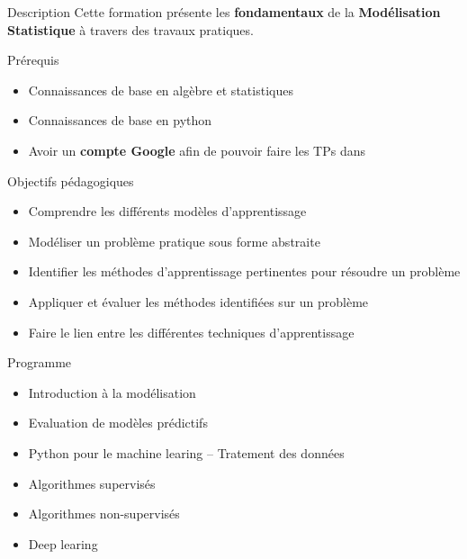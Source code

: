 
\begin{frame}{Description}
  Cette formation présente les \textbf{fondamentaux} de la \textbf{Modélisation Statistique} à travers des travaux pratiques.
\end{frame}

\begin{frame}{Prérequis}
  \begin{itemize}
  \item Connaissances de base en algèbre et statistiques
  \item Connaissances de base en python
  \item Avoir un \textbf{compte Google} afin de pouvoir faire les TPs dans 
  \end{itemize}
\end{frame}

\begin{frame}{Objectifs pédagogiques}
  \begin{itemize}
  \item Comprendre les différents modèles d'apprentissage
  \item Modéliser un problème pratique sous forme abstraite
  \item Identifier les méthodes d'apprentissage pertinentes pour résoudre un problème
  \item Appliquer et évaluer les méthodes identifiées sur un problème
  \item Faire le lien entre les différentes techniques d'apprentissage
  \end{itemize}
\end{frame}

\begin{frame}{Programme}
  \begin{itemize}
  \item Introduction à la modélisation
  \item Evaluation de modèles prédictifs
  \item Python pour le machine learing -- Tratement des données
  \item Algorithmes supervisés
  \item Algorithmes non-supervisés
  \item Deep learing
  \end{itemize}
\end{frame}
